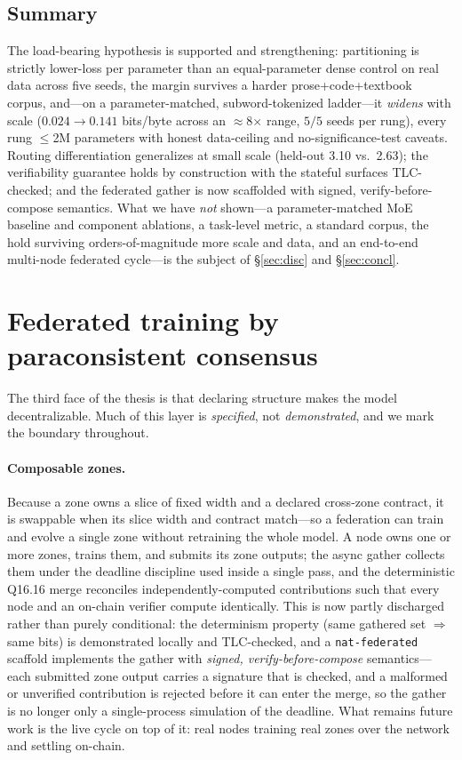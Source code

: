 \documentclass[11pt]{article}
\newcommand{\Qff}{Q16.16}
\begin{document}
\subsection{Summary}
The load-bearing hypothesis is supported and strengthening: partitioning is strictly lower-loss per
parameter than an equal-parameter dense control on real data across five seeds, the margin survives a
harder prose+code+textbook corpus, and---on a parameter-matched, subword-tokenized ladder---it
\emph{widens} with scale ($0.024\to0.141$ bits/byte across an $\approx$8$\times$ range, $5/5$ seeds per
rung), every rung $\le$2M parameters with honest data-ceiling and no-significance-test caveats.
Routing differentiation generalizes at small scale (held-out 3.10 vs.\ 2.63); the verifiability
guarantee holds by construction with the stateful surfaces TLC-checked; and the federated gather is
now scaffolded with signed, verify-before-compose semantics. What we have \emph{not} shown---a
parameter-matched MoE baseline and component ablations, a task-level metric, a standard corpus, the
hold surviving orders-of-magnitude more scale and data, and an end-to-end multi-node federated
cycle---is the subject of \S\ref{sec:disc} and \S\ref{sec:concl}.

\section{Federated training by paraconsistent consensus}\label{sec:fed}

The third face of the thesis is that declaring structure makes the model decentralizable. Much of this
layer is \emph{specified}, not \emph{demonstrated}, and we mark the boundary throughout.

\paragraph{Composable zones.}
Because a zone owns a slice of fixed width and a declared cross-zone contract, it is swappable when
its slice width and contract match---so a federation can train and evolve a single zone without
retraining the whole model. A node owns one or more zones, trains them, and submits its zone outputs;
the async gather collects them under the deadline discipline used inside a single pass, and the
deterministic \Qff{} merge reconciles independently-computed contributions such that every node and
an on-chain verifier compute identically. This is now partly discharged rather than purely
conditional: the determinism property (same gathered set $\Rightarrow$ same bits) is demonstrated
locally and TLC-checked, and a \texttt{nat-federated} scaffold implements the gather with
\emph{signed, verify-before-compose} semantics---each submitted zone output carries a signature that
is checked, and a malformed or unverified contribution is rejected before it can enter the merge, so
the gather is no longer only a single-process simulation of the deadline. What remains future work is
the live cycle on top of it: real nodes training real zones over the network and settling on-chain.
\end{document}
